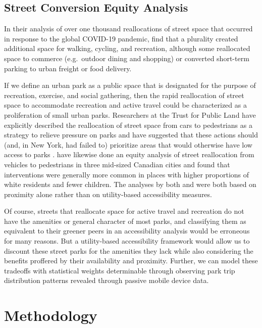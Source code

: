 \documentclass[3p, authoryear, review]{elsarticle} %
\begin{document}
\hypertarget{street-conversion-equity-analysis}{%
\subsection{Street Conversion Equity Analysis}\label{street-conversion-equity-analysis}}

In their analysis of over one thousand reallocations of street space that
occurred in response to the global COVID-19 pandemic, \citet{combs2021shifting} find
that a plurality created additional space for walking, cycling, and recreation,
although some reallocated space to commerce (e.g.~outdoor dining and shopping)
or converted short-term parking to urban freight or food delivery.

If we define an urban park as a public space that is designated for the purpose
of recreation, exercise, and social gathering, then the rapid reallocation of
street space to accommodate recreation and active travel could be characterized
as a proliferation of small urban parks. Researchers at the Trust for Public
Land have explicitly described the reallocation of street space from cars to
pedestrians as a strategy to relieve pressure on parks \citep{hussain_parks_2020} and
have suggested that these actions should (and, in New York, had failed to)
prioritize areas that would otherwise have low access to parks
\citep{compton_parks_2020}. \citet{fischer_covid-19_2021} have likewise done an equity
analysis of street reallocation from vehicles to pedestrians in three mid-sized
Canadian cities and found that interventions were generally more common in
places with higher proportions of white residents and fewer children. The
analyses by both \citet{compton_parks_2020} and \citet{fischer_covid-19_2021} were both based
on proximity alone rather than on utility-based accessibility measures.

Of course, streets that reallocate space for active travel and recreation do not
have the amenities or general character of most parks, and classifying them as
equivalent to their greener peers in an accessibility analysis would be
erroneous for many reasons. But a utility-based accessibility framework would
allow us to discount these street parks for the amenities they lack while also
considering the benefits proffered by their availability and proximity. Further,
we can model these tradeoffs with statistical weights determinable through
observing park trip distribution patterns revealed through passive mobile device
data.

\hypertarget{methodology}{%
\section{Methodology}\label{methodology}}
\end{document}
